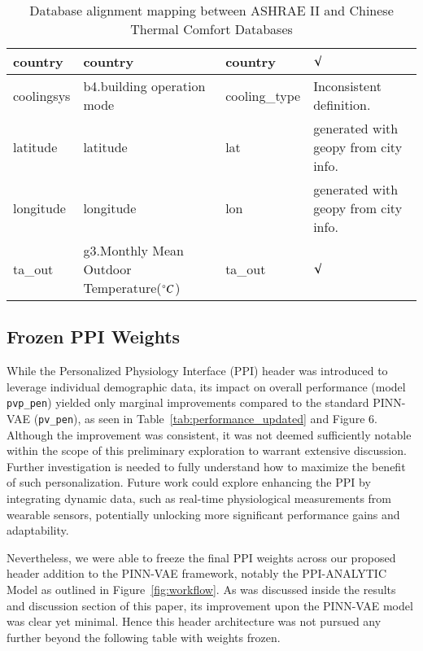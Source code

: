 \begin{table}[h!]
{\begin{tabular}{|l|l|l|l|}
      country                      & country                        & country             & $\surd$ \\ \hline
      coolingsys                   & b4.building operation mode     & cooling\_type       & Inconsistent definition. \\ \hline
      latitude                     & latitude                       & lat                 & generated with geopy from city info.\\ \hline
      longitude                    & longitude                      & lon                 & generated with geopy from city info. \\ \hline
      ta\_out & g3.Monthly Mean Outdoor Temperature($\degree C$)    & ta\_out             & $\surd$ \\ \hline
      \end{tabular}}
  \caption{Database alignment mapping between ASHRAE II and Chinese Thermal Comfort Databases}
  \label{tab:table-map}
\end{table}

\subsection{Frozen PPI Weights}
While the Personalized Physiology Interface (PPI) header was introduced to leverage individual demographic data, its impact on overall performance (model \texttt{pvp\_pen}) yielded only marginal improvements compared to the standard PINN-VAE (\texttt{pv\_pen}), as seen in Table~\ref{tab:performance_updated} and Figure 6. Although the improvement was consistent, it was not deemed sufficiently notable within the scope of this preliminary exploration to warrant extensive discussion. Further investigation is needed to fully understand how to maximize the benefit of such personalization. Future work could explore enhancing the PPI by integrating dynamic data, such as real-time physiological measurements from wearable sensors, potentially unlocking more significant performance gains and adaptability.


Nevertheless, we were able to freeze the final PPI weights across our proposed header addition to the PINN-VAE framework, notably the PPI-ANALYTIC Model as outlined in Figure~\ref{fig:workflow}. As was discussed inside the results and discussion section of this paper, its improvement upon the PINN-VAE model was clear yet minimal. Hence this header architecture was not pursued any further beyond the following table with weights frozen.

